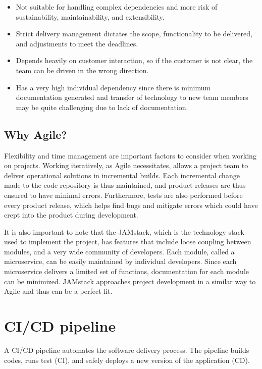\begin{itemize}
    \item Not suitable for handling complex dependencies and more risk of sustainability, maintainability, and extensibility.
    \item Strict delivery management dictates the scope, functionality to be delivered, and adjustments to meet the deadlines.
    \item Depends heavily on customer interaction, so if the customer is not clear, the team can be driven in the wrong direction.
    \item Has a very high individual dependency since there is minimum documentation generated and transfer of technology to new team members may be quite challenging due to lack of documentation.
\end{itemize}

\subsection{Why Agile?}

Flexibility and time management are important factors to consider when working on projects.
Working iteratively, as Agile necessitates, allows a project team to deliver operational solutions in incremental builds.
Each incremental change made to the code repository is thus maintained, and product releases are thus ensured to have minimal errors.
Furthermore, tests are also performed before every product release, which helps find bugs and mitigate errors which 
could have crept into the product during development.

It is also important to note that the JAMstack, which is the technology stack used to implement the project, 
has features that include loose coupling between modules, and a very wide community of developers. Each module, 
called a microservice, can be easily maintained by individual developers. Since each microservice delivers a limited set of functions, documentation for each module can be minimized. JAMstack approaches project development in a 
similar way to Agile and thus can be a perfect fit.

\section{CI/CD pipeline}

A CI/CD pipeline automates the software delivery process. The pipeline builds codes, runs test (CI),
and safely deploys a new version of the application (CD).

